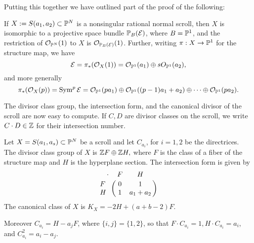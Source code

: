 Putting this together we have outlined part of the proof of the following:

\begin{fact}\label{push-forward formula}
 If $X := S(a_{1}, a_{2})\subset \PP^{N}$ is a nonsingular rational normal scroll, then
 $X$ is isomorphic to a projective space bundle $\PP_{B}(\sE)$, where $B = \PP^{1}$, and the restriction of $\sO_{\PP^{N}}(1)$ to $X$
 is $\sO_{\PP_B(\sE)}(1)$. Further, writing $\pi: X\to \PP^{1}$ for the structure map, we have
$$
\sE = \pi_{*}(\sO_{X}(1)) = \sO_{\PP^{1}}(a_{1}) \oplus sO_{\PP^{1}}(a_{2}),
$$
and more generally 
$$
\pi_{*}(\sO_{X}(p)) = \Sym^{p}\sE = \sO_{\PP^{1}}(pa_{1}) \oplus \sO_{\PP^{1}}((p-1)a_{1}+a_{2})
\oplus \cdots\oplus \sO_{\PP^{1}}(pa_{2}).
$$
\end{fact}


 The divisor class group, the intersection form, and the canonical divisor of the scroll are now easy to compute. If $C,D$ are divisor classes on the scroll, we write $C\cdot D\in \ZZ$ for their intersection number.
 
\begin{theorem}
 Let $X = S(a_{1},a_{s})\subset \PP^{N}$ be a scroll and let $C_{a_{i}}$, for $i = 1,2$ be the directrices.
  The divisor
 class group of $X$ is 
 $
  \ZZ F \oplus \ZZ H,
 $
where $F$ is the class of a fiber of the structure map and $H$ is the hyperplane section. The
intersection form is given by
$$\bordermatrix{\kern 10pt\cdot&F&H\cr
F&0&1\cr
H&1&a_{1}+a_{2}
}$$
 The canonical class of $X$ is
$K_{X} = -2H+(a+b-2)F$. 

Moreover $C_{a_{i}} = H-a_{j}F$, where $\{i,j\} = \{1,2\}$, so that
 $F\cdot C_{a_{i}} = 1, H\cdot C_{a_{i}} = a_{i}$, and $C_{a_{i}}^{2} = a_{i}-a_{j}$.
\end{theorem}
 
